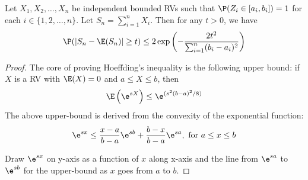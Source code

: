 \begin{prop}\label{P:HoeffdingsInequality}
Let $X_1,X_2,\ldots,X_n$ be independent bounded RVs such that $\P(Z_i \in [a_i,b_i])=1$ for each $i \in \{1,2,\ldots,n\}$. Let $S_n = \sum_{i=1}^n X_i$. Then for any $t>0$, we have
\begin{equation}\label{EqHoeffdingsInequality}
\P (\vert S_n - \E(S_n) \vert \geq t) \leq 2 \exp \left(-\frac{2t^2}{\sum_{i=1}^n (b_i-a_i)^2}\right)
\end{equation}
\end{prop}

\begin{proof}
The core of proving Hoeffding's inequality is the following upper bound: if $X$ is a RV with $\E(X)=0$ and $a \leq X \leq b$, then
\[
\E \left( \e^{sX}\right) \leq \e^{(s^2(b-a)^2/8)}
\] 
The above upper-bound is derived from the convexity of the exponential function:
\[
\e^{sx} \leq \frac{x-a}{b-a}\e^{sb} + \frac{b-x}{b-a}\e^{sa}, \text{ for } a \leq x \leq b
\]

{\scriptsize Draw $\e^{sx}$ on y-axis as a function of $x$ along x-axis and the line from $\e^{sa}$ to $\e^{sb}$ for the upper-bound as $x$ goes from $a$ to $b$.}

\vspace{4cm}


\end{proof}
